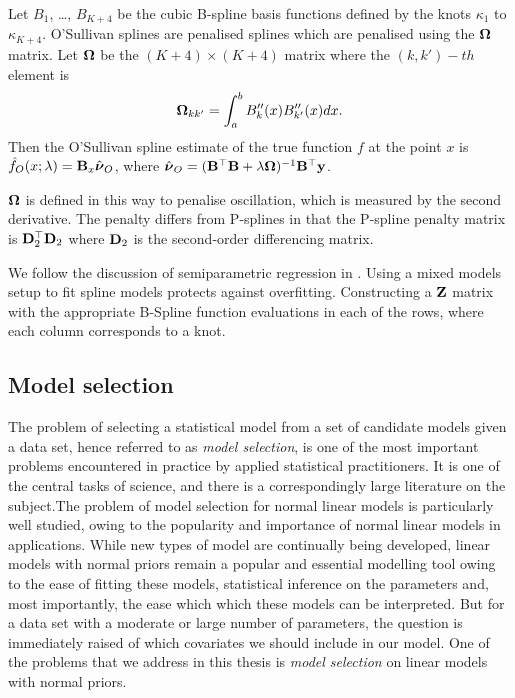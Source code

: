 Let $B_1$, \ldots, $B_{K+4}$ be the cubic B-spline basis functions defined by the knots $\kappa_1$ to
$\kappa_{K+4}$. O'Sullivan splines are penalised splines which are penalised using the ${\boldsymbol \Omega}$ matrix.
Let ${\boldsymbol \Omega}$ be the $(K+4) \times (K+4)$ matrix where the $(k, k')-th$ element is
\[
	{\boldsymbol \Omega}_{k k'} = \int_a^b B''_k(x) B''_{k'}(x) dx.
\]
Then the O'Sullivan spline estimate of the true function $f$ at the point $x$ is
$\hat{f}_O(x; \lambda) = {\bf B}_x \hat{{\boldsymbol \nu}}_O$, where
$\hat{{\boldsymbol \nu}}_O = ({\bf B}^\top {\bf B} + \lambda {\boldsymbol\Omega})^{-1} {\bf B}^\top {\bf y}$.

${\boldsymbol \Omega}$ is defined in this way to penalise oscillation, which is measured by the second derivative.
The penalty differs from P-splines in that the P-spline penalty matrix is ${\bf D}_2^\top {\bf D}_2$ where ${\bf D}_2$ is
the second-order differencing matrix.

We follow the discussion of semiparametric regression in \cite{ruppert_wand_carroll_2003}.
Using a mixed models setup to fit spline models protects against overfitting.
Constructing a ${\bf Z}$ matrix with the appropriate B-Spline function evaluations in each of the rows, where
each column corresponds to a knot.

\subsection{Model selection}
The problem of selecting a statistical model from a set of candidate models given a data set, hence referred
to as \emph{model selection}, is one of the most important problems encountered in practice by applied
statistical practitioners. It is one of the central tasks of science, and there is a correspondingly large
literature on the subject.The problem of model selection for normal linear models is particularly well
studied, owing to the popularity and importance of normal linear models in applications. While new types of
model are continually being developed, linear models with normal priors remain a popular and essential
modelling tool owing to the ease of fitting these models, statistical inference on the parameters and, most
importantly, the ease which which these models can be interpreted. But for a data set with a moderate or large
number of parameters, the question is immediately raised of which covariates we should include in our model.
One of the problems that we address in this thesis is \emph{model selection} on linear models with normal
priors.

